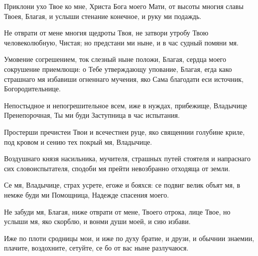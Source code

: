 \begin{mymulticols}
\slavan

Приклони ухо Твое ко мне, Христа Бога моего Мати, от высоты многия славы Твоея, Благая, и услыши стенание конечное, и руку ми подаждь. 

\inynen

 Не отврати от мене многия щедроты Твоя, не затвори утробу Твою человеколюбную, Чистая; но предстани ми ныне, и в час судный помяни мя.




Умовение согрешением, ток слезный ныне положи, Благая, сердца моего сокрушение приемлющи: о Тебе утверждающу упование, Благая, егда како страшнаго мя избавиши огненнаго мучения, яко Сама благодати еси источник, Богородительнице. 


Непостыдное и непогрешительное всем, иже в нуждах, прибежище, Владычице Пренепорочная, Ты ми буди Заступница в час испытания. 


Простерши пречистеи Твои и всечестнеи руце, яко священнии голубине криле, под кровом и сению тех покрый мя, Владычице. 

\slavan

Воздушнаго князя насильника, мучителя, страшных путей стоятеля и напраснаго сих словоиспытателя, сподоби мя прейти невозбранно отходяща от земли. 

\inynen

 Се мя, Владычице, страх усрете, егоже и бояхся: се подвиг велик объят мя, в немже буди ми Помощница, Надежде спасения моего.




Не забуди мя, Благая, ниже отврати от мене, Твоего отрока, лице Твое, но услыши мя, яко скорблю, и вонми души моей, и сию избави. 


Иже по плоти сродницы мои, и иже по духу братие, и друзи, и обычнии знаемии, плачите, воздохните, сетуйте, се бо от вас ныне разлучаюся. 


\end{mymulticols}
